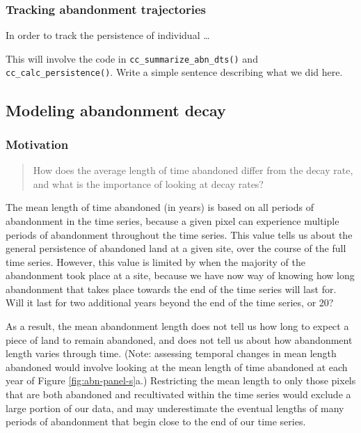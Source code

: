 \documentclass[
]{article}
\begin{document}
\hypertarget{tracking-abandonment-trajectories}{%
\subsubsection{Tracking abandonment trajectories}\label{tracking-abandonment-trajectories}}

In order to track the persistence of individual \ldots{}

This will involve the code in \texttt{cc\_summarize\_abn\_dts()} and \texttt{cc\_calc\_persistence()}.
Write a simple sentence describing what we did here.

\hypertarget{modeling-abandonment-decay}{%
\subsection{Modeling abandonment decay}\label{modeling-abandonment-decay}}

\hypertarget{motivation}{%
\subsubsection{Motivation}\label{motivation}}

\begin{quote}
How does the average length of time abandoned differ from the decay rate, and what is the importance of looking at decay rates?
\end{quote}

The mean length of time abandoned (in years) is based on all periods of abandonment in the time series, because a given pixel can experience multiple periods of abandonment throughout the time series.
This value tells us about the general persistence of abandoned land at a given site, over the course of the full time series.
However, this value is limited by when the majority of the abandonment took place at a site, because we have now way of knowing how long abandonment that takes place towards the end of the time series will last for.
Will it last for two additional years beyond the end of the time series, or 20?

As a result, the mean abandonment length does not tell us how long to expect a piece of land to remain abandoned, and does not tell us about how abandonment length varies through time.
(Note: assessing temporal changes in mean length abandoned would involve looking at the mean length of time abandoned at each year of Figure \ref{fig:abn-panel-s}a.)
Restricting the mean length to only those pixels that are both abandoned and recultivated within the time series would exclude a large portion of our data, and may underestimate the eventual lengths of many periods of abandonment that begin close to the end of our time series.
\end{document}
